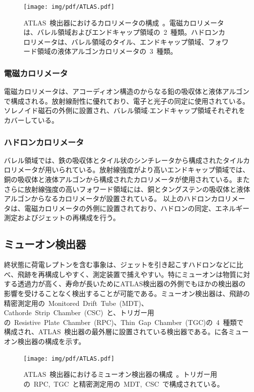 \begin{figure}[tbp]
        \centering   
        \texttt{[image: img/pdf/ATLAS.pdf]}
        \caption[ATLAS~検出器におけるカロリメータの構成]{ATLAS~検出器におけるカロリメータの構成~\cite{TR:01}。電磁カロリメータは、バレル領域およびエンドキャップ領域の~2~種類。ハドロンカロリメータは、バレル領域のタイル、エンドキャップ領域、フォワード領域の液体アルゴンカロリメータの~3~種類。}\label{fig:calo}
\end{figure}

\subsubsection{電磁カロリメータ}
電磁カロリメータは、アコーディオン構造のからなる鉛の吸収体と液体アルゴンで構成される。放射線耐性に優れており、電子と光子の同定に使用されている。ソレノイド磁石の外側に設置され、バレル領域$\cdot$エンドキャップ領域それぞれをカバーしている。

\subsubsection{ハドロンカロリメータ}
バレル領域では、鉄の吸収体とタイル状のシンチレータから構成されたタイルカロリメータが用いられている。放射線強度がより高いエンドキャップ領域では、銅の吸収体と液体アルゴンから構成されたカロリメータが使用されている。またさらに放射線強度の高いフォワード領域には、銅とタングステンの吸収体と液体アルゴンからなるカロリメータが設置されている。
以上のハドロンカロリメータは、電磁カロリメータの外側に設置されており、ハドロンの同定、エネルギー測定およびジェットの再構成を行う。


\subsection{ミューオン検出器}
終状態に荷電レプトンを含む事象は、ジェットを引き起こすハドロンなどに比べ、飛跡を再構成しやすく、測定装置で捕えやすい。特にミューオンは物質に対する透過力が高く、寿命が長いためにATLAS検出器の外側でもほかの検出器の影響を受けることなく検出することが可能である。ミューオン検出器は、飛跡の精密測定用の~Monitored~Drift~Tube~(MDT)、Cathorde~Strip~Chamber~(CSC)~と、トリガー用の~Resistive~Plate~Chamber~(RPC)、Thin~Gap~Chamber~(TGC)の~4~種類で構成され、ATLAS~検出器の最外層に設置されている検出器である。に各ミューオン検出器の構成を示す。
\begin{figure}[tbp]
        \centering   
        \texttt{[image: img/pdf/ATLAS.pdf]}
        \caption[ATLAS~検出器におけるミューオン検出器の構成]{ATLAS~検出器におけるミューオン検出器の構成~\cite{TR:01}。トリガー用の~RPC,~TGC~と精密測定用の~MDT,~CSC~で構成されている。}\label{fig:mud}
\end{figure}

